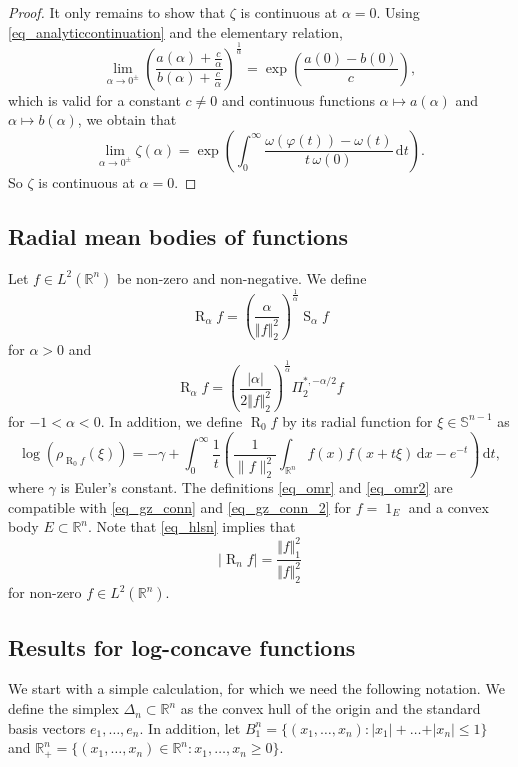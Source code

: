 \documentclass{amsart}
\newcommand{\omr}[1]{\operatorname{R}_{#1}\!}
\newcommand{\R}{\mathbb R}
\newcommand{\sn}{{\mathbb S}^{n-1}}
\renewcommand{\d}{\,\mathrm{d}}
\newcommand{\vol}[1]{\vert #1\vert}
\renewcommand{\chi}{\operatorname{1}}
\newcommand{\hls}[1]{\operatorname{S}_{#1}\!} %
\begin{document}
\begin{proof}
It only remains to show that $\zeta$ is continuous at $\alpha = 0$. Using \eqref{eq_analyticcontinuation} and the elementary relation,
\[
\lim_{\alpha\to 0^{\pm }} \left(\frac{a(\alpha)+\frac{c}{\alpha}}{b(\alpha)+\frac{c}{\alpha}}\right)^{\frac 1{\alpha}} =
\exp\left(\frac{a(0) - b(0)}{c}\right),
\]
which is valid for a constant $c\ne0$ and continuous functions $\alpha\mapsto a(\alpha)$ and $\alpha\mapsto b(\alpha)$, we obtain that
\begin{equation*}
    \label{eq_limitG}
\lim_{\alpha\to 0^{\pm }} \zeta(\alpha)=\exp \left(\int_0^{\infty } \frac{\omega (\varphi(t) ) - \omega(t) }{t \,\omega(0)} \d t\right).
\end{equation*}
So $\zeta$ is continuous at $\alpha=0$.
\end{proof}


\subsection{Radial mean bodies of functions}
Let $f\in L^2(\R^n)$ be non-zero and non-negative. 
We define 
\begin{equation}\label{eq_omr}
\omr \alpha f =
   \left(\frac{ \alpha}{\Vert f\Vert_2^2}\right)^\frac1\alpha \hls \alpha f
\end{equation}
for $\alpha>0$ and 
\begin{equation}\label{eq_omr2}
\omr \alpha f =
   \left(\frac{\vert \alpha\vert}{2\Vert f\Vert_2^2}\right)^\frac1\alpha \Pi_2^{\ast,-\alpha/2} f
\end{equation}
for $-1<\alpha<0$. 
In addition, we define $\omr0 f$ by its radial function for $\xi\in\sn$ as
\begin{equation}
\log(\rho_{\omr 0 f}(\xi))=  -\gamma + \int_0^\infty \frac 1t \left( \frac 1{\|f\|_2^2} \int_{\R^n} f(x) f(x+t \xi) \d x - e^{-t} \right) \d t,
\end{equation}
where $\gamma$ is Euler's constant. The definitions \eqref{eq_omr} and \eqref{eq_omr2} are compatible with \eqref{eq_gz_conn} and \eqref{eq_gz_conn_2} for $f=\chi_E$ and a convex body $E\subset\R^n$. Note that
\eqref{eq_hlsn} implies that
\begin{equation}\label{eq_omrn}
    \vol{\omr n f} =\frac{\Vert f\Vert_1^2}{\Vert f\Vert_2^2}
\end{equation}
for non-zero $f\in L^2(\R^n)$.


\subsection{Results for log-concave functions} 
We start with a simple calculation, for which we need the following notation. 
We define the simplex $\Delta_n\subset \R^n$ as the convex hull of the origin and  the standard basis vectors $e_1, \dots, e_n$. In addition, let
$B_1^n=\{(x_1, \dots, x_n): \vert x_1\vert + \dots +\vert x_n\vert \le 1\}$
and $\R^n_+=\{(x_1, \dots,x_n)\in\R^n: x_1, \dots, x_n\ge 0\}$. 
\end{document}
